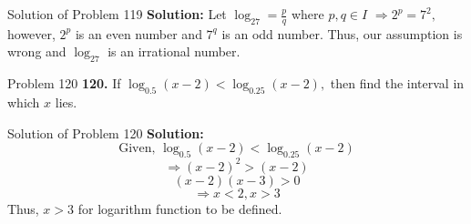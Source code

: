 \documentclass[aspectratio=169,8pt]{beamer}
\begin{document}
\begin{frame}{Solution of Problem 119}
  \textbf{Solution:} Let $\log_27 = \frac{p}{q}$ where $p, q\in I$
  \linebreak\linebreak
  $\Rightarrow 2^p = 7^2,$ however, $2^p$ is an even number and $7^q$ is an odd number. Thus, our assumption is wrong and $\log_27$ is an irrational number.
\end{frame}
\begin{frame}{Problem 120}
  \textbf{120.} If $\log_{0.5}(x - 2) < \log_{0.25}(x - 2),$ then find the interval in which $x$ lies.
\end{frame}
\begin{frame}{Solution of Problem 120}
  \textbf{Solution:} $$\text{Given,~}\log_{0.5}(x - 2) < \log_{0.25}(x - 2)$$
  $$\Rightarrow (x - 2)^2 > (x - 2)$$
  $$(x - 2)(x - 3) > 0$$
  $$\Rightarrow x < 2, x > 3$$
  Thus, $x > 3$ for logarithm function to be defined.
\end{frame}
\end{document}
